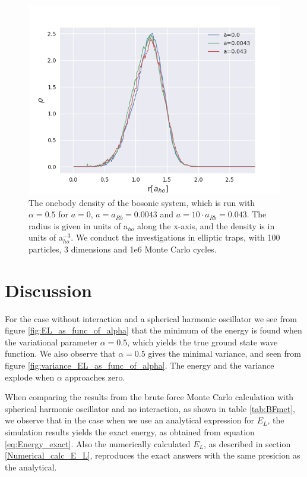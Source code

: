 \documentclass[norsk,a4paper,12pt]{article}
\begin{document}
\begin{figure} [H]
    \centering
    \includegraphics[scale=0.80]{images/ob_100.png}
    \caption{The onebody density of the bosonic system, which is run with $\alpha=0.5$ for $a=0$, $a=a_{Rb}=0.0043$ and $a=10\cdot a_{Rb}=0.043$. The radius is given in units of a$_{ho}$ along the x-axis, and the density is in units of a$_{ho}^{-3}$. We conduct the investigations in elliptic traps, with 100 particles, 3 dimensions and 1e6 Monte Carlo cycles.}
    \label{fig:ob1}
\end{figure}
 

\section{Discussion} \label{Discussion}
For the case without interaction and a spherical harmonic oscillator we see from figure \ref{fig:EL_as_func_of_alpha} that the minimum of the energy is found when the variational parameter $\alpha=0.5$, which yields the true ground state wave function. We also observe that $\alpha=0.5$ gives the minimal variance, and seen from figure \ref{fig:variance_EL_as_func_of_alpha}. The energy and the variance explode when $\alpha$ approaches zero.  
\par 
\vspace{3mm}

When comparing the results from the brute force Monte Carlo calculation with spherical harmonic oscillator and no interaction, as shown in table \ref{tab:BFmet}, we observe that in the case when we use an analytical expression for $E_L$, the simulation results yields the exact energy, as obtained from equation \ref{eq:Energy_exact}. Also the numerically calculated $E_L$, as described in section \ref{Numerical_calc_E_L}, reproduces the exact answers with the same presicion as the analytical. 
\end{document}
